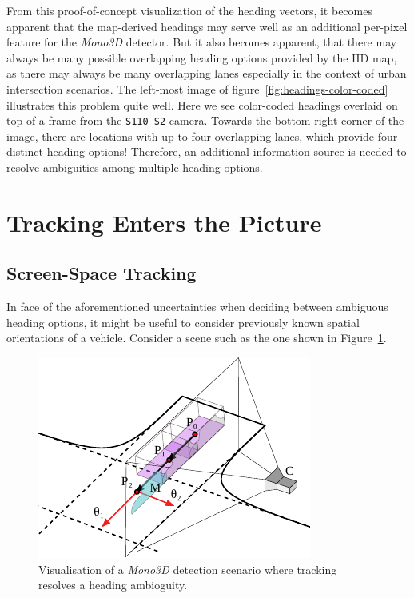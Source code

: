 From this proof-of-concept visualization of the heading vectors, it becomes apparent that the map-derived headings may serve well as an additional per-pixel feature for the \textit{Mono3D} detector.
But it also becomes apparent, that there may always be many possible overlapping heading options provided by the HD map, as there may always be many overlapping lanes \textemdash especially in the context of urban intersection scenarios.
The left-most image of figure~\ref{fig:headings-color-coded} illustrates this problem quite well.
Here we see color-coded headings overlaid on top of a frame from the \texttt{S110-S2} camera.
Towards the bottom-right corner of the image, there are locations with up to four overlapping lanes, which provide four distinct heading options!
Therefore, an additional information source is needed to resolve ambiguities among multiple heading options.


\section{Tracking Enters the Picture}
\label{sec:tracking}

\subsection{Screen-Space Tracking}
\label{subsec:sstracking}

In face of the aforementioned uncertainties when deciding between ambiguous heading options, it might be useful to consider previously known spatial orientations of a vehicle.
Consider a scene such as the one shown in Figure~\ref{fig:tracking}.

\begin{figure}[htb]
    \centering
    \includegraphics[width=0.7\linewidth]{figures/tracking}
    \caption{Visualisation of a \textit{Mono3D} detection scenario where tracking resolves a heading ambioguity.}
    \label{fig:tracking}
\end{figure}

